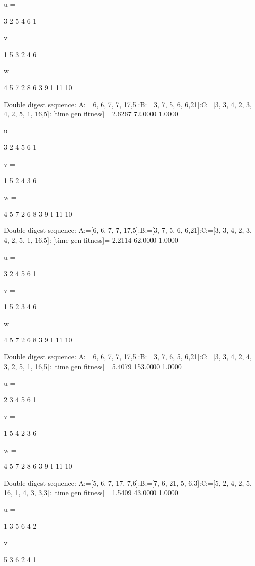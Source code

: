 u =

     3     2     5     4     6     1


v =

     1     5     3     2     4     6


w =

     4     5     7     2     8     6     3     9     1    11    10

Double digest sequence:
A:=[6, 6, 7, 7, 17,5]:B:=[3, 7, 5, 6, 6,21]:C:=[3, 3, 4, 2, 3, 4, 2, 5, 1, 16,5]:
[time gen fitness]=
    2.6267   72.0000    1.0000


u =

     3     2     4     5     6     1


v =

     1     5     2     4     3     6


w =

     4     5     7     2     6     8     3     9     1    11    10

Double digest sequence:
A:=[6, 6, 7, 7, 17,5]:B:=[3, 7, 5, 6, 6,21]:C:=[3, 3, 4, 2, 3, 4, 2, 5, 1, 16,5]:
[time gen fitness]=
    2.2114   62.0000    1.0000


u =

     3     2     4     5     6     1


v =

     1     5     2     3     4     6


w =

     4     5     7     2     6     8     3     9     1    11    10

Double digest sequence:
A:=[6, 6, 7, 7, 17,5]:B:=[3, 7, 6, 5, 6,21]:C:=[3, 3, 4, 2, 4, 3, 2, 5, 1, 16,5]:
[time gen fitness]=
    5.4079  153.0000    1.0000


u =

     2     3     4     5     6     1


v =

     1     5     4     2     3     6


w =

     4     5     7     2     8     6     3     9     1    11    10

Double digest sequence:
A:=[5, 6, 7, 17, 7,6]:B:=[7, 6, 21, 5, 6,3]:C:=[5, 2, 4, 2, 5, 16, 1, 4, 3, 3,3]:
[time gen fitness]=
    1.5409   43.0000    1.0000


u =

     1     3     5     6     4     2


v =

     5     3     6     2     4     1


